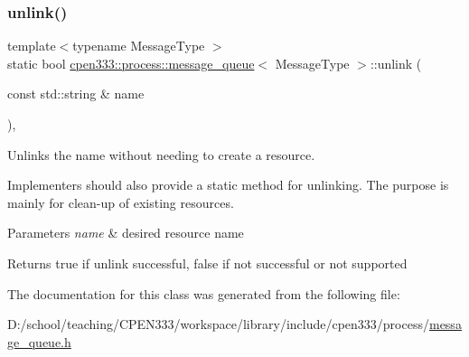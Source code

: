\mbox{\label{classcpen333_1_1process_1_1message__queue_aca172436d5b30c250c301d3c224598b6}} 
\subsubsection{\texorpdfstring{unlink()}{unlink()}\hspace{0.1cm}{\footnotesize\ttfamily [2/2]}}
{\footnotesize\ttfamily template$<$typename Message\+Type $>$ \\
static bool \hyperlink{classcpen333_1_1process_1_1message__queue}{cpen333\+::process\+::message\+\_\+queue}$<$ Message\+Type $>$\+::unlink (\begin{DoxyParamCaption}\item[{const std\+::string \&}]{name }\end{DoxyParamCaption})\hspace{0.3cm}{\ttfamily [inline]}, {\ttfamily [static]}}



Unlinks the name without needing to create a resource. 

Implementers should also provide a static method for unlinking. The purpose is mainly for clean-\/up of existing resources.


\begin{DoxyParams}{Parameters}
{\em name} & desired resource name \\
\hline
\end{DoxyParams}
\begin{DoxyReturn}{Returns}
{\ttfamily true} if unlink successful, {\ttfamily false} if not successful or not supported 
\end{DoxyReturn}


The documentation for this class was generated from the following file\+:\begin{DoxyCompactItemize}
\item 
D\+:/school/teaching/\+C\+P\+E\+N333/workspace/library/include/cpen333/process/\hyperlink{message__queue_8h}{message\+\_\+queue.\+h}\end{DoxyCompactItemize}
